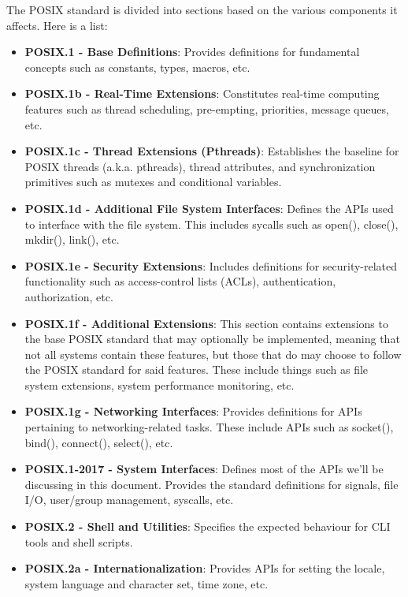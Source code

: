 \documentclass{article}
\begin{document}
The POSIX standard is divided into sections based on the various components it affects. Here is a list:

\begin{itemize}

\item{%
    \textbf{POSIX.1 - Base Definitions}: Provides definitions for fundamental concepts such as constants, types,
    macros, etc.
}

\item{%
    \textbf{POSIX.1b - Real-Time Extensions}: Constitutes real-time computing features such as thread
    scheduling, pre-empting, priorities, message queues, etc.
}

\item{%
    \textbf{POSIX.1c - Thread Extensions (Pthreads)}: Establishes the baseline for POSIX threads (a.k.a.
    pthreads), thread attributes, and synchronization primitives such as mutexes and conditional variables.
}

\item{%
    \textbf{POSIX.1d - Additional File System Interfaces}: Defines the APIs used to interface with the file
    system. This includes sycalls such as open(), close(), mkdir(), link(), etc.
}

\item{%
    \textbf{POSIX.1e - Security Extensions}: Includes definitions for security-related functionality such as
    access-control lists (ACLs), authentication, authorization, etc.
}

\item{%
    \textbf{POSIX.1f - Additional Extensions}: This section contains extensions to the base POSIX standard
    that may optionally be implemented, meaning that not all systems contain these features, but those that do
    may choose to follow the POSIX standard for said features. These include things such as file system
    extensions, system performance monitoring, etc.
}

\item{%
    \textbf{POSIX.1g - Networking Interfaces}: Provides definitions for APIs pertaining to networking-related
    tasks. These include APIs such as socket(), bind(), connect(), select(), etc.
}

\item{%
    \textbf{POSIX.1-2017 - System Interfaces}: Defines most of the APIs we'll be discussing in this document.
    Provides the standard definitions for signals, file I/O, user/group management, syscalls, etc.
}

\item{%
    \textbf{POSIX.2 - Shell and Utilities}: Specifies the expected behaviour for CLI tools and shell scripts.
}

\item{%
    \textbf{POSIX.2a - Internationalization}: Provides APIs for setting the locale, system language and
    character set, time zone, etc.
}

\end{itemize}
\end{document}
